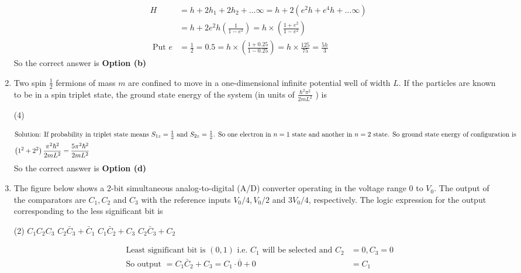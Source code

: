 \begin{enumerate}
\begin{answer}
\begin{align*}
	H&=h+2 h_{1}+2 h_{2}+\ldots \infty=h+2\left(e^{2} h+e^{4} h+\ldots \infty\right) \\
	&=h+2 e^{2} h\left(\frac{1}{1-e^{2}}\right)=h \times\left(\frac{1+e^{2}}{1-e^{2}}\right)\\
	\text { Put } e&=\frac{1}{2}=0.5=h \times\left(\frac{1+0.25}{1-0.25}\right)=h \times \frac{125}{75}=\frac{5 h}{3}
	\end{align*}
		So the correct answer is \textbf{Option (b)}
\end{answer}
\item Two spin $\frac{1}{2}$ fermions of mass $m$ are confined to move in a one-dimensional infinite potential well of width $L$. If the particles are known to be in a spin triplet state, the ground state energy of the system (in units of $\frac{\hbar^{2} \pi^{2}}{2 m L^{2}}$ ) is
 \begin{tasks}(4)
\end{tasks}
\begin{answer}
	\begin{align*}
	\intertext{Solution: If probability in triplet state means $S_{1 z}=\frac{1}{2}$ and $S_{2 z}=\frac{1}{2}$. So one electron in $n=1$ state and another in $n=2$ state. So ground state energy of configuration is}
	\left(1^{2}+2^{2}\right) \frac{\pi^{2} \hbar^{2}}{2 m L^{2}}&=\frac{5 \pi^{2} \hbar^{2}}{2 m L^{2}}
	\end{align*}
		So the correct answer is \textbf{Option (d)}
\end{answer}
\item  The figure below shows a 2-bit simultaneous analog-to-digital (A/D) converter operating in the voltage range 0 to $V_{0}$. The output of the comparators are $C_{1}, C_{2}$ and $C_{3}$ with the reference inputs $V_{0} / 4, V_{0} / 2$ and $3 V_{0} / 4$, respectively. The logic expression for the output corresponding to the less significant bit is	
 \begin{tasks}(2)
	\task[\textbf{a.}]$C_{1} C_{2} C_{3}$
	\task[\textbf{b.}]$C_{2} \bar{C}_{3}+\bar{C}_{1}$
	\task[\textbf{c.}]$C_{1} \bar{C}_{2}+C_{3}$
	\task[\textbf{d.}] $C_{2} \bar{C}_{3}+C_{2}$	
\end{tasks}
\begin{answer}
	\begin{align*}
	\text { Least significant bit is }(0,1) \text { i.e. } C_{1} \text { will be selected and } C_{2}&=0, C_{3}=0\\
	\text { So output }=C_{1} \bar{C}_{2}+C_{3}=C_{1} \cdot \overline{0}+0&=C_{1}

\end{align*}
\end{answer}
\end{enumerate}
